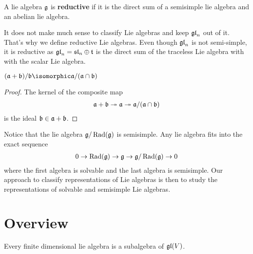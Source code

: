 \begin{definition}[Reductive]
    A lie algebra $\mathfrak{g}$ is \textbf{reductive} if it is the direct sum of a semisimple lie algebra and an abelian lie algebra.
\end{definition}
\begin{insight}
   It does not make much sense to classify Lie algebras and keep $\Lie{gl}_n$ out of it. That's why we define reductive Lie algebras. Even though $\Lie{gl}_n$ is not semi-simple, it is reductive as $\Lie{gl}_n = \Lie{sl}_n\oplus \Lie{t}$ is the direct sum of the traceless Lie algebra with with the scalar Lie algebra.
\end{insight}

\begin{lemma}
    $ (\mathfrak{a} + \mathfrak{b})/\mathfrak{b} \isomorphic \mathfrak a / (\mathfrak a \cap \mathfrak b) $
\end{lemma}
\begin{proof} The kernel of the composite map 
   \begin{align}
       \mathfrak{a} + \mathfrak{b} \twoheadrightarrow \mathfrak{a} \twoheadrightarrow \mathfrak{a}/(\mathfrak{a} \cap \mathfrak{b})
   \end{align} 
   is the ideal $\mathfrak{b} \in \mathfrak{a} + \mathfrak{b}$.
\end{proof}


Notice that the lie algebra $\mathfrak{g}/\operatorname{Rad}(\mathfrak{g})$ is semisimple. Any lie algebra fits into the exact sequence
\begin{align}
    0\to \operatorname{Rad}(\mathfrak{g}) \to \mathfrak{g} \to \mathfrak{g}/\operatorname{Rad}(\mathfrak{g}) \to 0
\end{align}
where the first algebra is solvable and the last algebra is semisimple. Our approach to classify representations of Lie  algebras is then to study the representations of solvable and semisimple Lie algebras.



\section{Overview}




\begin{theorem}
Every finite dimensional lie algebra is a subalgebra of $\mathfrak{gl}(V)$.
\end{theorem}

\begin{theorem}
    
\end{theorem}

